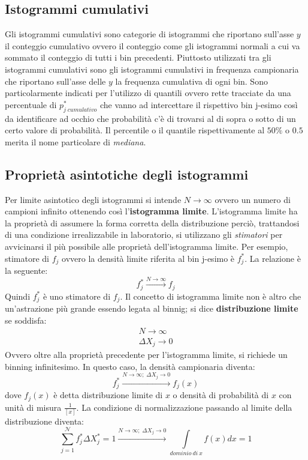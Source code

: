 \documentclass[11pt,a4paper]{book}
\begin{document}
\subsection{Istogrammi cumulativi} 
Gli istogrammi cumulativi sono categorie di istogrammi che riportano sull'asse $ y $ il conteggio cumulativo ovvero il conteggio come gli istogrammi normali a cui va sommato il conteggio di tutti i bin precedenti. Piuttosto utilizzati tra gli istogrammi cumulativi sono gli istogrammi cumulativi in frequenza campionaria che riportano sull'asse delle $ y $ la frequenza cumulativa di ogni bin. Sono particolarmente indicati per l'utilizzo di quantili ovvero rette tracciate da una percentuale di $ p^*_{j\; cumulativo} $ che vanno ad intercettare il rispettivo bin j-esimo così da identificare ad occhio che probabilità c'è di trovarsi al di sopra o sotto di un certo valore di probabilità. Il percentile o il quantile rispettivamente al $ 50 \% $ o $ 0.5 $ merita il nome particolare di \textit{mediana}.
\subsection{Proprietà asintotiche degli istogrammi} \label{Proprità asintotiche degl istogrammi} 
Per limite asintotico degli istogrammi si intende $ N \to \infty $ ovvero un numero di campioni infinito ottenendo così l'\textbf{istogramma limite}. L'istogramma limite ha la proprietà di assumere la forma corretta della distribuzione perciò, trattandosi di una condizione irrealizzabile in laboratorio, si utilizzano gli \textit{stimatori} per avvicinarsi il più possibile alle proprietà dell'istogramma limite. Per esempio, stimatore di $ f_j $ ovvero la densità limite riferita al bin j-esimo è $ f^*_j $. La relazione è la seguente:
\begin{equation}
f^*_j \stackrel{N \to \infty}{ \longrightarrow } f_j
\end{equation}
Quindi $ f^*_j $ è uno stimatore di $ f_j $.
Il concetto di istogramma limite non è altro che un'astrazione più grande essendo legata al binnig; si dice \textbf{distribuzione limite} se soddisfa: 
\begin{eqnarray}
N \to \infty \\
\Delta X_j \to 0
\end{eqnarray}
Ovvero oltre alla proprietà precedente per l'istogramma limite, si richiede un binning infinitesimo. In questo caso, la densità campionaria diventa: 
\begin{equation}
f^*_j  \xrightarrow{N \to \infty ;\; \Delta X_j \to 0} f_j(x)
\end{equation}
dove $ f_j(x) $ è detta distribuzione limite di $ x  $ o densità di probabilità di $ x $ con unità di misura $ \frac{1}{[x]} $. La condizione di normalizzazione passando al limite della distribuzione diventa:
\begin{equation}
\sum\limits_{j = 1}^{\mathcal{N}} f_j^* \Delta X_j^* = 1 \xrightarrow{N \to \infty ;\; \Delta X_j \to 0} \int\limits_{\mathit{dominio\ di\ }x}f(x)dx = 1
\end{equation}
\end{document}
